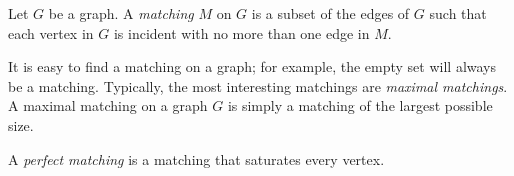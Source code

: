 \documentclass[12pt]{article}
\begin{document}
Let $G$ be a graph.  A \emph{matching} $M$ on $G$ is a subset of the edges of $G$ such that each vertex in $G$ is incident with no more than one edge in $M$.

It is easy to find a matching on a graph; for example, the empty set will always be a matching.  Typically, the most interesting matchings are \emph{maximal matchings}.  A maximal matching on a graph $G$ is simply a matching of the largest possible size.

A \emph{perfect matching} is a matching that saturates every vertex.

\end{document}
